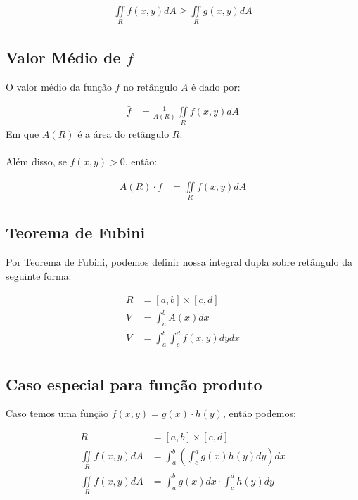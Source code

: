 \documentclass{article}
\newcommand{\doubleint}[1] {\iint\limits_R #1 dA}
\theoremstyle{definition}
\begin{document}
            \begin{align*}
                \doubleint{f(x,y)} \geq \doubleint{g(x,y)}
            \end{align*}

        \subsection{Valor Médio de $f$}
            O valor médio da função $f$ no retângulo $A$ é dado por:

            \begin{align*}
                \bar{f} &= \frac{1}{A(R)} \doubleint{f(x,y)}
            \end{align*}
            Em que $A(R)$ é a área do retângulo $R$.
            
            \paragraph{}
            Além disso, se $f(x,y) > 0$, então:
            
            \begin{align*}
                A(R) \cdot \bar{f} &= \doubleint{f(x,y)}
            \end{align*}

        \subsection{Teorema de Fubini}
            Por Teorema de Fubini, podemos definir nossa integral dupla sobre retângulo
            da seguinte forma:

            \begin{align*}
                R &= [a,b] \times [c, d]\\
                V &= \int_a^b A(x) dx\\
                V &= \int_a^b \int_c^d f(x,y) dy dx\\
            \end{align*}

        \subsection{Caso especial para função produto}
            Caso temos uma função $f(x,y) = g(x) \cdot h(y)$, então podemos:

            \begin{align*}
                R &= [a,b] \times [c,d]\\
                \doubleint{f(x,y)} &= \int_a^b \left( \int_c^d g(x) h(y) dy \right) dx\\
                \doubleint{f(x,y)} &= \int_a^b g(x) dx \cdot \int_c^d h(y) dy
            \end{align*}
\end{document}

